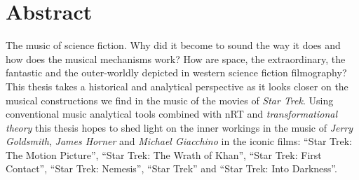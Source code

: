 \thispagestyle{empty}
\chapter*{Abstract}
The music of science fiction. Why did it become to sound the way it does and how does the musical mechanisms work? How are space, the extraordinary, the fantastic and the outer-worldly depicted in western science fiction filmography? This thesis takes a historical and analytical perspective as it looks closer on the musical constructions we find in the music of the movies of \textit{Star Trek}. Using conventional music analytical tools combined with \acf{nRT} and \textit{transformational theory} this thesis hopes to shed light on the inner workings in the music of \textit{Jerry Goldsmith}, \textit{James Horner} and \textit{Michael Giacchino} in the iconic films: ``Star Trek: The Motion Picture'', ``Star Trek: The Wrath of Khan'', ``Star Trek: First Contact'', ``Star Trek: Nemesis'', ``Star Trek'' and ``Star Trek: Into Darkness''.